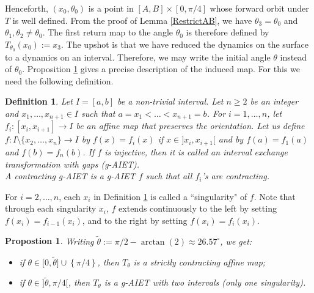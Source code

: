 \documentclass[11pt]{article}
\newtheorem{prop}[thm]{Propostion}
\newtheorem*{definition}{Definition}
\begin{document}
Henceforth, $\left(x_{0},\theta_{0}\right)$ is a point in $\left[A,B\right]\times\left[0,\pi/4\right]$ whose forward orbit under $T$ is well defined. From the proof of Lemma \ref{RestrictAB}, we have $\theta_{3}=\theta_{0}$ and $\theta_{1},\theta_{2}\neq\theta_{0}$. The first return map to the angle $\theta_{0}$ is therefore defined by $T_{\theta_{0}}\left(x_{0}\right):=x_{3}$. The upshot is that we have reduced the dynamics on the surface to a dynamics on an interval. Therefore, we may write the initial angle $\theta$ instead of $\theta_{0}$. Proposition \ref{prop:echangesintervinduits} gives a precise description of the induced map. For this we need the following definition.

\begin{definition}
\label{def:gAIET}
    Let $I=[a,b]$ be a non-trivial interval. Let $n\geq2$ be an integer and $x_{1},\dots,x_{n+1}\in I$ such that $a=x_{1}<\dots<x_{n+1}=b$. For $i=1,\dots,n$, let $f_{i}:[x_{i},x_{i+1}]\rightarrow I$ be an affine map that preserves the orientation. Let us define $f:I\setminus\{x_{2},\dots,x_{n}\}\rightarrow I$ by $f(x)=f_{i}(x)$ if $x\in]x_{i},x_{i+1}[$ and by $f(a)=f_{1}(a)$ and $f(b)=f_{n}(b)$. If $f$ is injective, then it is called an interval exchange transformation with gaps (g-AIET).\\
    A contracting g-AIET is a g-AIET $f$ such that all $f_{i}$'s are contracting.
\end{definition}

For $i=2,\dots,n$, each $x_{i}$ in Definition \ref{def:gAIET} is called a ``singularity" of $f$. Note that through each singularity $x_{i}$, $f$ extends continuously to the left by setting $f(x_{i})=f_{i-1}(x_{i})$, and to the right by setting $f(x_{i})=f_{i}(x_{i})$.

\begin{prop}
    \label{prop:echangesintervinduits}
    Writing $\widetilde{\theta}:=\pi/2-\arctan\left(2\right)\approx26.57^{\circ}$, we get:
    \begin{itemize}
        \item if $\theta\in\bigl[0,\widetilde{\theta}\bigr]\cup\left\{\pi/4\right\}$, then $T_{\theta}$ is a strictly contracting affine map;
        \item if $\theta\in\bigl]\widetilde{\theta},\pi/4\bigr[$, then $T_{\theta}$ is a g-AIET with two intervals (only one singularity).
    \end{itemize}
\end{prop}
\end{document}
